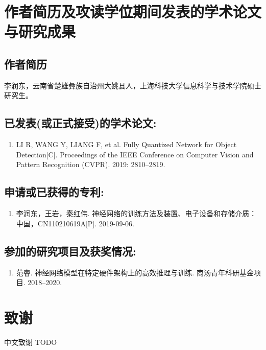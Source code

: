 \chapter{作者简历及攻读学位期间发表的学术论文与研究成果}

\section*{作者简历}
李润东，云南省楚雄彝族自治州大姚县人，上海科技大学信息科学与技术学院硕士研究生。

\section*{已发表(或正式接受)的学术论文:}
{
\setlist[enumerate]{}
\begin{enumerate}[nosep]
    \item LI R, WANG Y, LIANG F, et al. Fully Quantized Network for Object Detection[C]. Proceedings of the IEEE Conference on Computer Vision and Pattern Recognition (CVPR). 2019: 2810--2819.
\end{enumerate}
}

\section*{申请或已获得的专利:}
{
\setlist[enumerate]{}
\begin{enumerate}[nosep]
    \item 李润东，王岩，秦红伟. 神经网络的训练方法及装置、电子设备和存储介质：中国，CN110210619A[P]. 2019-09-06.
\end{enumerate}
}

\section*{参加的研究项目及获奖情况:}
{
\setlist[enumerate]{}
\begin{enumerate}[nosep]
    \item 范睿. 神经网络模型在特定硬件架构上的高效推理与训练. 商汤青年科研基金项目. 2018--2020.
\end{enumerate}
}

\chapter[致谢]{致\quad 谢}%
\thispagestyle{noheaderstyle}%
中文致谢 TODO

\cleardoublepage[plain]%
